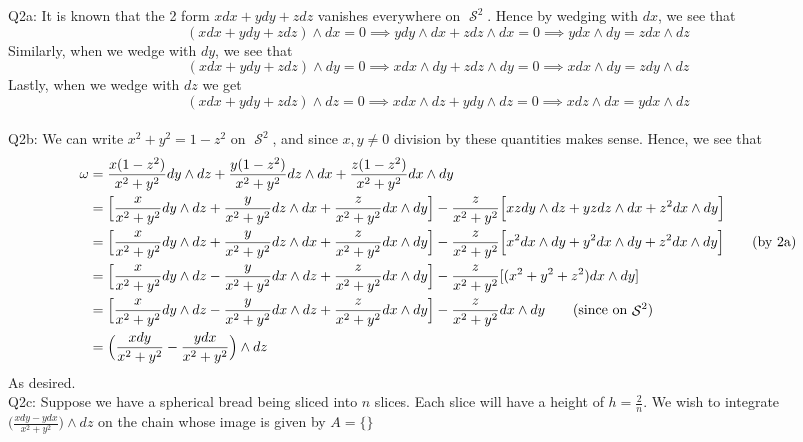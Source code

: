 \documentclass[letterpaper]{article}
\DeclareMathOperator{\s}{\mathcal{S}}
\begin{document}
\noindent Q2a: It is known that the 2 form $xdx+ydy+zdz$ vanishes everywhere on $\s^2$. Hence by wedging with $dx$, we see that 
$$(xdx+ydy+zdz)\wedge dx = 0 \implies ydy\wedge dx + z dz\wedge dx =0 \implies ydx \wedge dy = z dx\wedge dz $$
Similarly, when we wedge with $dy$, we see that 
$$(xdx+ydy+zdz)\wedge dy = 0 \implies xdx \wedge dy + z dz\wedge dy =0 \implies x dx \wedge dy = z dy\wedge dz$$
Lastly, when we wedge with $dz$ we get 
$$(xdx+ydy+zdz)\wedge dz = 0 \implies xdx\wedge dz + ydy\wedge dz = 0 \implies x dz \wedge dx = y dx\wedge dz$$
\newline \\ Q2b: We can write $x^2+y^2=1-z^2$ on $\s^2$, and since $x,y\neq 0$ division by these quantities makes sense. Hence, we see that 
\begin{align*}
    \omega &= \frac{x(1-z^2)}{x^2+y^2}dy\wedge dz + \frac{y(1-z^2)}{x^2+y^2}dz \wedge dx + \frac{z(1-z^2)}{x^2+y^2}dx \wedge dy
    \\ & = \Big[ \frac{x}{x^2+y^2}dy\wedge dz + \frac{y}{x^2+y^2}dz\wedge dx + \frac{z}{x^2+y^2}dx\wedge dy \Big] -\frac{z}{x^2+y^2} \Big[xzdy \wedge dz + yz dz\wedge dx + z^2 dx\wedge dy \Big]
    \\ & = \Big[ \frac{x}{x^2+y^2}dy\wedge dz + \frac{y}{x^2+y^2}dz\wedge dx + \frac{z}{x^2+y^2}dx\wedge dy \Big] - \frac{z}{x^2+y^2}\Big[ x^2dx \wedge dy + y^2 dx\wedge dy + z^2 dx\wedge dy \Big] \tag{by 2a}
    \\ & = \Big[ \frac{x}{x^2+y^2}dy\wedge dz - \frac{y}{x^2+y^2}dx\wedge dz + \frac{z}{x^2+y^2}dx\wedge dy \Big] - \frac{z}{x^2+y^2}[(x^2+y^2+z^2)dx\wedge dy]
    \\ & = \Big[ \frac{x}{x^2+y^2}dy\wedge dz - \frac{y}{x^2+y^2}dx\wedge dz + \frac{z}{x^2+y^2}dx\wedge dy \Big] - \frac{z}{x^2+y^2}dx\wedge dy \tag{since on $\s^2$}
    \\ & = \Big(\frac{xdy}{x^2+y^2} -\frac{ydx}{x^2+y^2}\Big)\wedge dz
\end{align*} As desired. 
\newline \\ Q2c: Suppose we have a spherical bread being sliced into $n$ slices. Each slice will have a height of $h=\frac{2}{n}$. We wish to integrate $\big(\frac{xdy - ydx}{x^2+y^2} \big)\wedge dz$ on the chain whose image is given by $A = \{ \}$
\end{document}
